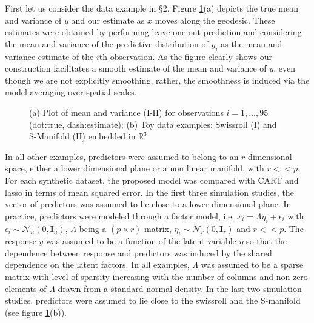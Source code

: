 \documentclass{article}
\newcommand{\Real}{\mathbb{R}}
\providecommand{\mb}[1]{\boldsymbol{#1}}
\providecommand{\mc}[1]{\mathcal{#1}}
\begin{document}
First let us consider the data example in \S 2. Figure \ref{fig1}(a) depicts the true mean and variance of $y$ and our estimate as $x$ moves along the geodesic. These estimates were obtained by performing leave-one-out prediction and considering the mean and variance of the predictive distribution of $y_i$ as the mean and variance estimate of the $i$th observation. As the figure clearly shows our construction facilitates a smooth estimate of the mean and variance of $y$, even though we are not explicitly smoothing, rather, the smoothness is induced via the  model averaging over spatial scales.


\begin{figure}
    \centering
    \caption{(a) Plot of mean and variance (I-II) for observations $i=1, \ldots, 95$ (dot:true, dash:estimate); (b) Toy data examples: Swissroll (I) and S-Manifold (II) embedded in $\Real^3$}
    \label{fig1}
\end{figure}
%



In all other examples, predictors were assumed to belong to an $r$-dimensional space, either a lower dimensional plane or a non linear manifold, with $r<<p$. For each synthetic dataset, the proposed model was compared with CART and lasso in terms of mean squared error. In the first three simulation studies, the vector of predictors was assumed to lie close to a lower dimensional plane. In practice,  predictors were modeled through a factor model, i.e. $x_i=\Lambda \eta_i + \epsilon_i$ with $\epsilon_i \sim \mc{N}_n(0,\mb{I}_n)$, $\Lambda$ being a $(p \times r)$ matrix, $\eta_i \sim \mc{N}_r(0,\mb{I}_r)$ and $r<<p$. The response $y$ was assumed to be a function of the latent variable $\eta$ so that  the dependence between response and predictors was induced by the shared dependence on the latent factors.  In all examples, $\Lambda$ was assumed to be a sparse matrix with level of sparsity increasing with the number of columns and non zero elements of $\Lambda$ drawn from a standard normal density. In the last two simulation studies, predictors were assumed to lie close to the swissroll and the S-manifold (see figure \ref{fig1}(b)).
%
\end{document}
